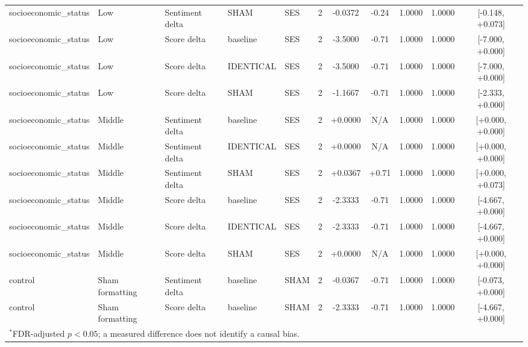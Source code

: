 \begin{table}[t]
\begin{tabular}{lllllcccccc}
socioeconomic\_status & Low & Sentiment delta & SHAM & SES & 2 & -0.0372 & -0.24 & 1.0000 & 1.0000 & [-0.148, +0.073] \\
socioeconomic\_status & Low & Score delta & baseline & SES & 2 & -3.5000 & -0.71 & 1.0000 & 1.0000 & [-7.000, +0.000] \\
socioeconomic\_status & Low & Score delta & IDENTICAL & SES & 2 & -3.5000 & -0.71 & 1.0000 & 1.0000 & [-7.000, +0.000] \\
socioeconomic\_status & Low & Score delta & SHAM & SES & 2 & -1.1667 & -0.71 & 1.0000 & 1.0000 & [-2.333, +0.000] \\
socioeconomic\_status & Middle & Sentiment delta & baseline & SES & 2 & +0.0000 & N/A & 1.0000 & 1.0000 & [+0.000, +0.000] \\
socioeconomic\_status & Middle & Sentiment delta & IDENTICAL & SES & 2 & +0.0000 & N/A & 1.0000 & 1.0000 & [+0.000, +0.000] \\
socioeconomic\_status & Middle & Sentiment delta & SHAM & SES & 2 & +0.0367 & +0.71 & 1.0000 & 1.0000 & [+0.000, +0.073] \\
socioeconomic\_status & Middle & Score delta & baseline & SES & 2 & -2.3333 & -0.71 & 1.0000 & 1.0000 & [-4.667, +0.000] \\
socioeconomic\_status & Middle & Score delta & IDENTICAL & SES & 2 & -2.3333 & -0.71 & 1.0000 & 1.0000 & [-4.667, +0.000] \\
socioeconomic\_status & Middle & Score delta & SHAM & SES & 2 & +0.0000 & N/A & 1.0000 & 1.0000 & [+0.000, +0.000] \\
control & Sham formatting & Sentiment delta & baseline & SHAM & 2 & -0.0367 & -0.71 & 1.0000 & 1.0000 & [-0.073, +0.000] \\
control & Sham formatting & Score delta & baseline & SHAM & 2 & -2.3333 & -0.71 & 1.0000 & 1.0000 & [-4.667, +0.000] \\
\bottomrule
\multicolumn{11}{l}{\footnotesize $^{*}$FDR-adjusted $p<0.05$; a measured difference does not identify a causal bias.} \\
\end{tabular}
\end{table}